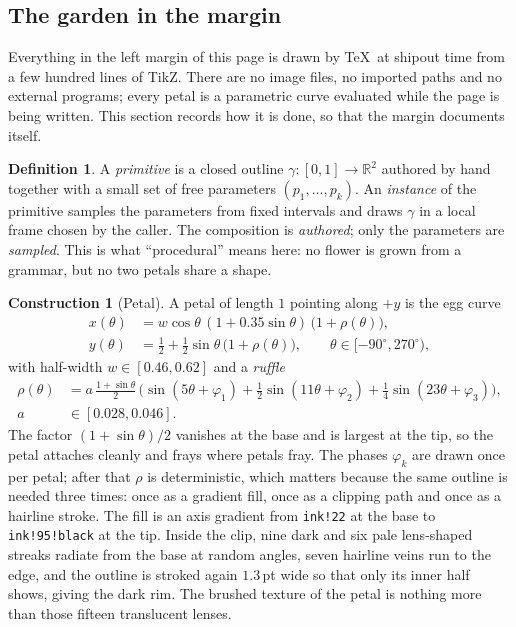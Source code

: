 \documentclass[11pt,a4paper]{article}
\theoremstyle{plain}
\theoremstyle{definition}
\newtheorem{definition}[proposition]{Definition}
\newtheorem{construction}[proposition]{Construction}
\begin{document}
\setcounter{section}{3}\setcounter{subsection}{1}
\subsection{The garden in the margin}

Everything in the left margin of this page is drawn by \TeX\ at shipout time from a few
hundred lines of TikZ. There are no image files, no imported paths and no external
programs; every petal is a parametric curve evaluated while the page is being written.
This section records how it is done, so that the margin documents itself.

\begin{definition}
A \emph{primitive} is a closed outline $\gamma\colon[0,1]\to\mathbb{R}^2$ authored by hand
together with a small set of free parameters $(p_1,\dots,p_k)$. An \emph{instance} of the
primitive samples the parameters from fixed intervals and draws $\gamma$ in a local frame
chosen by the caller. The composition is \emph{authored}; only the parameters are
\emph{sampled}. This is what ``procedural'' means here: no flower is grown from a grammar,
but no two petals share a shape.
\end{definition}

\begin{construction}[Petal]
A petal of length $1$ pointing along $+y$ is the egg curve
\begin{align*}
  x(\theta)&=w\cos\theta\,(1+0.35\sin\theta)\,\bigl(1+\rho(\theta)\bigr),\\
  y(\theta)&=\tfrac12+\tfrac12\sin\theta\,\bigl(1+\rho(\theta)\bigr),
  \qquad \theta\in[-90^\circ,270^\circ),
\end{align*}
with half-width $w\in[0.46,0.62]$ and a \emph{ruffle}
\begin{align*}
  \rho(\theta)&=a\,\frac{1+\sin\theta}{2}\,\bigl(\sin(5\theta+\varphi_1)
  +\tfrac12\sin(11\theta+\varphi_2)+\tfrac14\sin(23\theta+\varphi_3)\bigr),\\
  a&\in[0.028,0.046].
\end{align*}
The factor $(1+\sin\theta)/2$ vanishes at the base and is largest at the tip, so the petal
attaches cleanly and frays where petals fray. The phases $\varphi_k$ are drawn once per
petal; after that $\rho$ is deterministic, which matters because the same outline is
needed three times: once as a gradient fill, once as a clipping path and once as a
hairline stroke. The fill is an axis gradient from \texttt{ink!22} at the base to
\texttt{ink!95!black} at the tip. Inside the clip, nine dark and six pale lens-shaped
streaks radiate from the base at random angles, seven hairline veins run to the edge, and
the outline is stroked again $1.3\,$pt wide so that only its inner half shows, giving the
dark rim. The brushed texture of the petal is nothing more than those fifteen translucent
lenses.
\end{construction}
\end{document}
